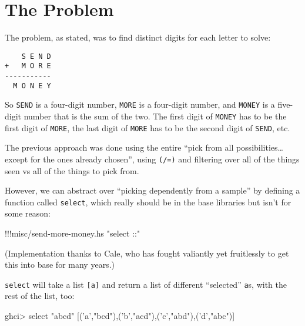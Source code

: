 \documentclass[]{article}
\newenvironment{Shaded}{}{}
\newcommand{\CharTok}[1]{\textcolor[rgb]{0.25,0.44,0.63}{{#1}}}
\newcommand{\StringTok}[1]{\textcolor[rgb]{0.25,0.44,0.63}{{#1}}}
\newcommand{\FunctionTok}[1]{\textcolor[rgb]{0.02,0.16,0.49}{{#1}}}
\newcommand{\NormalTok}[1]{{#1}}
\begin{document}
\section{The Problem}\label{the-problem}

The problem, as stated, was to find distinct digits for each letter to
solve:

\begin{verbatim}
    S E N D
+   M O R E
-----------
  M O N E Y
\end{verbatim}

So \texttt{SEND} is a four-digit number, \texttt{MORE} is a four-digit
number, and \texttt{MONEY} is a five-digit number that is the sum of the
two. The first digit of \texttt{MONEY} has to be the first digit of
\texttt{MORE}, the last digit of \texttt{MORE} has to be the second
digit of \texttt{SEND}, etc.

The previous approach was done using the entire ``pick from all
possibilities\ldots{}except for the ones already chosen'', using
\texttt{(/=)} and filtering over all of the things seen vs all of the
things to pick from.

However, we can abstract over ``picking dependently from a sample'' by
defining a function called \texttt{select}, which really should be in
the base libraries but isn't for some reason:

\begin{Shaded}
\begin{Highlighting}[]
\FunctionTok{!!!}\NormalTok{misc}\FunctionTok{/}\NormalTok{send}\FunctionTok{-}\NormalTok{more}\FunctionTok{-}\NormalTok{money}\FunctionTok{.}\NormalTok{hs }\StringTok{"select ::"}
\end{Highlighting}
\end{Shaded}

(Implementation thanks to Cale, who has fought valiantly yet fruitlessly
to get this into base for many years.)

\texttt{select} will take a list \texttt{{[}a{]}} and return a list of
different ``selected'' \texttt{a}s, with the rest of the list, too:

\begin{Shaded}
\begin{Highlighting}[]
\NormalTok{ghci}\FunctionTok{>} \NormalTok{select }\StringTok{"abcd"}
\NormalTok{[(}\CharTok{'a'}\NormalTok{,}\StringTok{"bcd"}\NormalTok{),(}\CharTok{'b'}\NormalTok{,}\StringTok{"acd"}\NormalTok{),(}\CharTok{'c'}\NormalTok{,}\StringTok{"abd"}\NormalTok{),(}\CharTok{'d'}\NormalTok{,}\StringTok{"abc"}\NormalTok{)]}
\end{Highlighting}
\end{Shaded}
\end{document}
